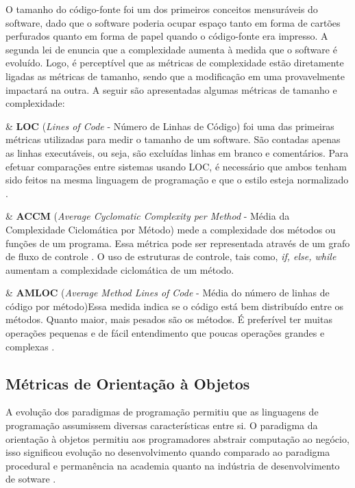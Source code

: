 \label{métricas tamanho e complexidade} 

O tamanho do código-fonte foi um dos primeiros conceitos mensuráveis do 
software, dado que o software poderia ocupar espaço tanto em forma de cartões 
perfurados quanto em forma de papel quando o código-fonte era impresso. 
A segunda lei de  enuncia que a complexidade aumenta à 
medida que o software é evoluído. Logo, é perceptível que as métricas de complexidade 
estão diretamente ligadas as métricas de tamanho, sendo que a modificação em 
uma provavelmente impactará na outra. A seguir são apresentadas 
algumas métricas de tamanho e complexidade:

\begin{easylist}[itemize]


	& \textbf{LOC} (\textit{Lines of Code} - Número de Linhas de Código)
	foi uma das primeiras métricas utilizadas para medir o tamanho de um 
	software. São contadas apenas as linhas executáveis, ou seja, são excluídas linhas em branco e comentários. Para efetuar comparações entre sistemas usando LOC, é necessário que ambos tenham sido feitos na mesma linguagem de programação e que o estilo esteja normalizado \cite{Jones91}.
	
	& \textbf{ACCM} (\textit{Average Cyclomatic Complexity per Method} - 
	Média da Complexidade Ciclomática por Método) mede a complexidade dos 
	métodos ou funções de um programa. Essa métrica pode ser representada 
	através de um grafo de fluxo de controle \cite{McCabe76}. O uso de 
	estruturas de controle, tais como, \textit{if, else, while} aumentam a 
	complexidade ciclomática de um método.

	& \textbf{AMLOC} (\textit{Average Method Lines of Code} - Média do número de linhas de código por método)Essa medida indica se o código está bem distribuído entre os métodos. Quanto maior, mais pesados são os métodos. É preferível ter muitas operações pequenas e de fácil entendimento que poucas operações grandes e complexas \cite{Meirelles2013}.

\end{easylist}


\subsection{Métricas de Orientação à Objetos}
\label{métrica objetos}

A evolução dos paradigmas de programação permitiu que as linguagens de 
programação assumissem diversas características entre si. O
paradigma da orientação à objetos permitiu aos programadores abstrair computação ao negócio, isso significou evolução no desenvolvimento quando comparado ao paradigma procedural e permanência na academia quanto na indústria de desenvolvimento de sotware \cite{Li1993}.

